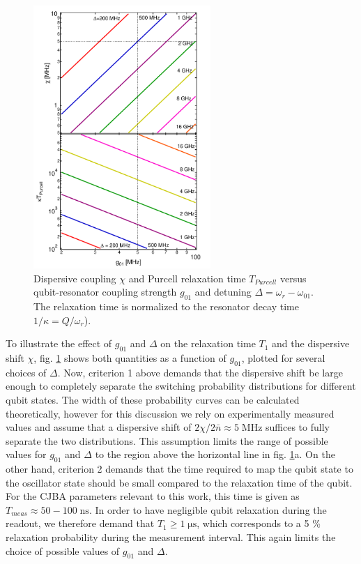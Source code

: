 \begin{figure}
	\includegraphics[width=0.6\textwidth]{./material/mathematica/readout_purcell_and_chi_vs_g}
	\caption[]{Dispersive coupling $\chi$ and Purcell relaxation time  $ T_{Purcell}$  versus qubit-resonator coupling strength $g_{01}$ and detuning $\Delta = \omega_{r}-\omega_{01}$. The relaxation time is normalized to the resonator decay time $1/\kappa=Q/\omega_r$).}
	\label{fig:purcell_rate_and_chi}
\end{figure}


To illustrate the effect of $g_{01}$ and $\Delta$ on the relaxation time $T_1$ and the dispersive shift $\chi$, fig. \ref{fig:purcell_rate_and_chi} shows both quantities as a function of $g_{01}$, plotted for several choices of $\Delta$. Now, criterion 1 above demands that the dispersive shift be large enough to completely separate the switching probability distributions for different qubit states. The width of these probability curves can be calculated theoretically, however for this discussion we rely on experimentally measured values and assume that a dispersive shift of $2\chi/2\bar{n} \approx 5\;\mathrm{MHz}$ suffices to fully separate the two distributions. This assumption limits the range of possible values for $g_{01}$ and $\Delta$ to the region above the horizontal line in fig. \ref{fig:purcell_rate_and_chi}a. On the other hand, criterion 2 demands that the time required to map the qubit state to the oscillator state should be small compared to the relaxation time of the qubit. For the CJBA parameters relevant to this work, this time is given as $T_{meas}\approx 50-100\;\mathrm{ns}$. In order to have negligible qubit relaxation during the readout, we therefore demand that $T_1 \ge 1\;\mathrm{\mu s}$, which corresponds to a 5 \% relaxation probability during the measurement interval. This again limits the choice of possible values of $g_{01}$ and $\Delta$. 

